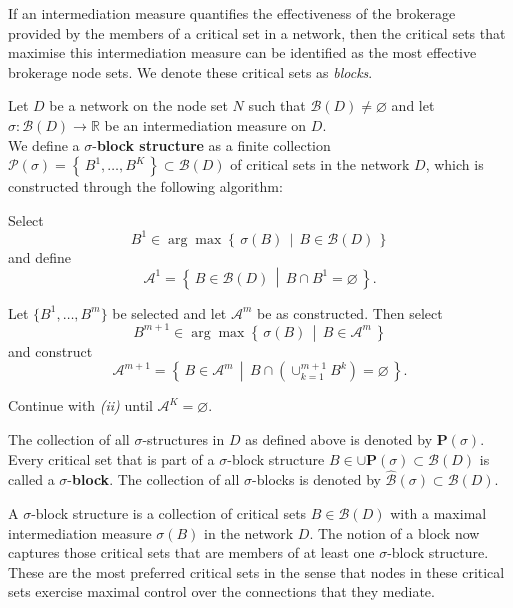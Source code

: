 If an intermediation measure quantifies the effectiveness of the brokerage provided by the members of a critical set in a network, then the critical sets that maximise this intermediation measure can be identified as the most effective brokerage node sets. We denote these critical sets as \emph{blocks}.
\begin{definition} \label{def:block}
Let $D$ be a network on the node set $N$ such that $\mathcal{B} (D) \neq \varnothing$ and let $\sigma \colon \mathcal{B} (D) \to \mathbb{R}$ be an intermediation measure on $D$.
\\
We define a $\sigma$-\textbf{block structure} as a finite collection $\mathcal{P} (\sigma ) = \left\{ \, B^1, \ldots ,B^K \, \right\} \subset \mathcal{B} (D)$ of critical sets in the network $D$, which is constructed through the following algorithm:
\begin{numm}
\item Select
\[
B^1 \in \arg\max \left\{ \, \sigma (B) \, \middle| \, B \in \mathcal{B} (D) \, \right\} 
\]
and define
\[
\mathcal{A}^1 = \left\{ \, B \in \mathcal{B} (D) \, \middle| \, B \cap B^1 = \varnothing \, \right\} .
\]

\item Let $\{ B^1 , \ldots ,B^m \}$ be selected and let $\mathcal{A}^m$ be as constructed. Then select
\begin{equation}
B^{m+1} \in \arg\max \left\{ \, \sigma (B) \, \middle| \, B \in \mathcal{A}^m \, \right\}
\end{equation}
and construct
\begin{equation}
\mathcal{A}^{m+1} = \left\{ \, B \in \mathcal{A}^m \, \middle| \, B \cap \left( \cup^{m+1}_{k=1} B^k \right) = \varnothing \, \right\} .
\end{equation}

\item Continue with \emph{(ii)} until $\mathcal{A}^K = \varnothing$.
\end{numm}
The collection of all $\sigma$-structures in $D$ as defined above is denoted by  $\mathbf{P} ( \sigma )$.
\\
Every critical set that is part of a $\sigma$-block structure $B \in \cup \mathbf{P} (\sigma ) \subset \mathcal{B} (D)$ is called a $\sigma$-\textbf{block}. The collection of all $\sigma$-blocks is denoted by $\widehat{\mathcal{B}} (\sigma ) \subset \mathcal{B} (D)$.
\end{definition}
A $\sigma$-block structure is a collection of critical sets $B \in \mathcal{B} (D)$ with a maximal intermediation measure $\sigma (B)$ in the network $D$. The notion of a block now captures those critical sets that are members of at least one $\sigma$-block structure. These are the most preferred critical sets in the sense that nodes in these critical sets exercise maximal control over the connections that they mediate.

